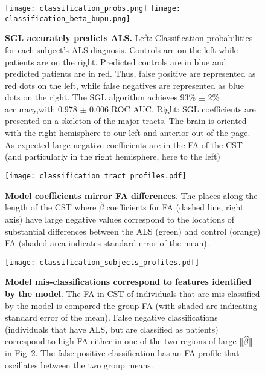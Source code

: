 \begin{figure}[h]
    \centering
    \texttt{[image: classification\_probs.png]}
    \texttt{[image: classification\_beta\_bupu.png]}

    \caption{{\bf SGL accurately predicts ALS.}
        Left: Classification probabilities for each subject's ALS diagnosis.
        Controls are on the left while patients are on the right. Predicted
        controls are in blue and predicted patients are in red. Thus, false
        positive are represented as red dots on the left, while false negatives
        are represented as blue dots on the right. The SGL algorithm achieves
        93\% $\pm$ 2\% accuracy,with 0.978 $\pm$ 0.006 ROC AUC. Right: SGL
        coefficients are presented on a skeleton of the major tracts. The brain
        is oriented with the right hemisphere to our left and anterior out of
        the page. As expected large negative coefficients are in the FA of the
        CST (and particularly in the right hemisphere, here to the left)}
    \label{fig:class-results}
\end{figure}

\begin{figure}[h]
    \centering
    \texttt{[image: classification\_tract\_profiles.pdf]}
    \caption{{\bf Model coefficients mirror FA differences}. The places along the
       length of the CST  where $\hat{\beta}$ coefficients for FA
       (dashed line, right axis) have large negative values correspond to the
       locations of substantial differences between the ALS (green) and control
       (orange) FA (shaded area indicates standard error of the mean).}
    \label{fig:class-profiles}
\end{figure}

\begin{figure}[h]
    \centering
        \texttt{[image: classification\_subjects\_profiles.pdf]}
    \caption{{\bf Model mis-classifications correspond to features identified by
       the model}. The FA in CST of individuals that are mis-classified by the
       model is compared the group FA (with shaded are indicating standard error
       of the mean). False negative classifications (individuals that have ALS,
       but are classified as patients) correspond to high FA either in one of
       the two regions of large $\lVert\widehat{\beta}\rVert$ in
       Fig~\ref{fig:class-profiles}. The false positive classification has
       an FA profile that oscillates between the two group means.
   }
    \label{fig:class-errors}
\end{figure}
